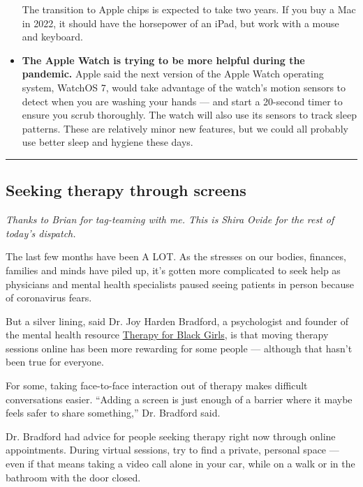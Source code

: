 \begin{itemize}
  The transition to Apple chips is expected to take two years. If you
  buy a Mac in 2022, it should have the horsepower of an iPad, but work
  with a mouse and keyboard.
\item
  \textbf{The Apple Watch is trying to be more helpful during the
  pandemic.} Apple said the next version of the Apple Watch operating
  system, WatchOS 7, would take advantage of the watch's motion sensors
  to detect when you are washing your hands --- and start a 20-second
  timer to ensure you scrub thoroughly. The watch will also use its
  sensors to track sleep patterns. These are relatively minor new
  features, but we could all probably use better sleep and hygiene these
  days.
\end{itemize}

\begin{center}\rule{0.5\linewidth}{\linethickness}\end{center}

\hypertarget{seeking-therapy-through-screens}{%
\subsection{Seeking therapy through
screens}\label{seeking-therapy-through-screens}}

\emph{Thanks to Brian for tag-teaming with me. This is Shira Ovide for
the rest of today's dispatch.}

The last few months have been A LOT. As the stresses on our bodies,
finances, families and minds have piled up, it's gotten more complicated
to seek help as physicians and mental health specialists paused seeing
patients in person because of coronavirus fears.

But a silver lining, said Dr. Joy Harden Bradford, a psychologist and
founder of the mental health resource
\href{https://therapyforblackgirls.com/about/}{Therapy for Black Girls},
is that moving therapy sessions online has been more rewarding for some
people --- although that hasn't been true for everyone.

For some, taking face-to-face interaction out of therapy makes difficult
conversations easier. ``Adding a screen is just enough of a barrier
where it maybe feels safer to share something,'' Dr. Bradford said.

Dr. Bradford had advice for people seeking therapy right now through
online appointments. During virtual sessions, try to find a private,
personal space --- even if that means taking a video call alone in your
car, while on a walk or in the bathroom with the door closed.

